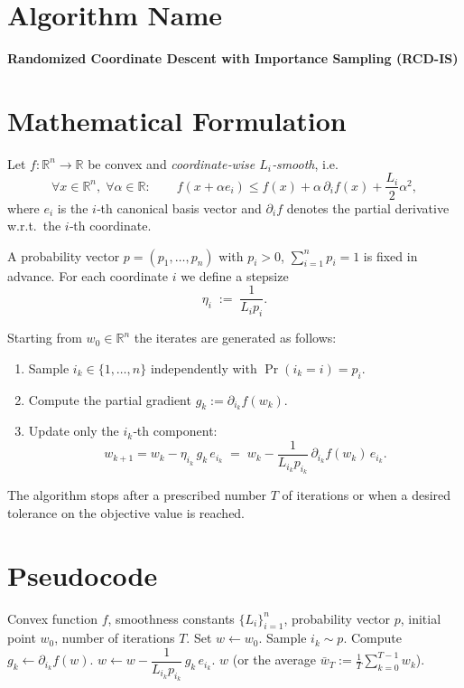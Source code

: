 \documentclass{article}
\newcommand{\R}{\mathbb{R}}
\begin{document}
\section*{Algorithm Name}
\textbf{Randomized Coordinate Descent with Importance Sampling (RCD-IS)}

\section*{Mathematical Formulation}
Let $f:\R^{n}\rightarrow\R$ be convex and \emph{coordinate‑wise $L_i$‑smooth}, i.e.
\begin{equation}
\label{eq:smooth}
\forall x\in\R^{n},\;\forall \alpha\in\R:\qquad 
f(x+\alpha e_i)\le f(x)+\alpha\,\partial_i f(x)+\frac{L_i}{2}\alpha^{2},
\end{equation}
where $e_i$ is the $i$‑th canonical basis vector and $\partial_i f$ denotes the partial derivative w.r.t.\ the $i$‑th coordinate.

A probability vector $p=(p_1,\dots,p_n)$ with $p_i>0$, $\sum_{i=1}^{n}p_i=1$ is fixed in advance.
For each coordinate $i$ we define a stepsize
\begin{equation}
\label{eq:stepsize}
\eta_i \;:=\; \frac{1}{L_i p_i}.
\end{equation}

Starting from $w_0\in\R^{n}$ the iterates are generated as follows:
\begin{enumerate}
\item Sample $i_k\in\{1,\dots,n\}$ independently with $\Pr(i_k=i)=p_i$.
\item Compute the partial gradient $g_{k}:=\partial_{i_k}f(w_k)$.
\item Update only the $i_k$‑th component:
\begin{equation}
\label{eq:update}
w_{k+1}=w_k-\eta_{i_k}\,g_{k}\,e_{i_k}
\;=\;
w_k-\frac{1}{L_{i_k}p_{i_k}}\,
\partial_{i_k}f(w_k)\,e_{i_k}.
\end{equation}
\end{enumerate}
The algorithm stops after a prescribed number $T$ of iterations or when a
desired tolerance on the objective value is reached.

\section*{Pseudocode}
\begin{algorithm}[H]
\caption{Randomized Coordinate Descent with Importance Sampling}
\begin{algorithmic}[1]
\Require Convex function $f$, smoothness constants $\{L_i\}_{i=1}^n$, probability
vector $p$, initial point $w_0$, number of iterations $T$.
\State Set $w\gets w_0$.
    \State Sample $i_k\sim p$.
    \State Compute $g_k\gets \partial_{i_k}f(w)$.
    \State $w\gets w-\dfrac{1}{L_{i_k}p_{i_k}}\,g_k\,e_{i_k}$.
\EndFor
\State \Return $w$ (or the average $\bar w_T:=\frac1T\sum_{k=0}^{T-1}w_k$).
\end{algorithmic}
\end{algorithm}
\end{document}

